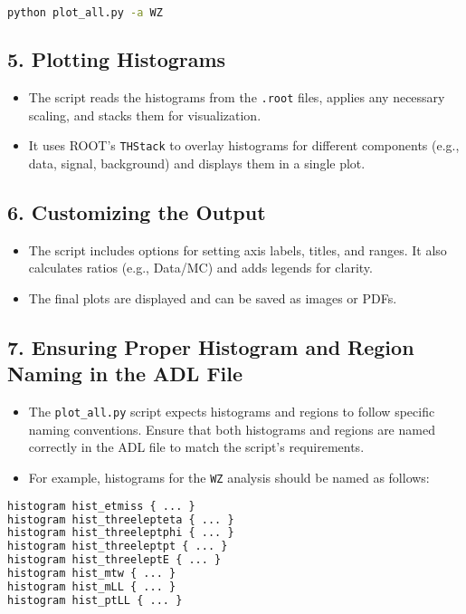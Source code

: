 \documentclass{article}
\begin{document}
\begin{lstlisting}[language=bash]
python plot_all.py -a WZ
\end{lstlisting}

\subsection*{5. Plotting Histograms}
\begin{itemize}
    \item The script reads the histograms from the \texttt{.root} files, applies any necessary scaling, and stacks them for visualization.
    \item It uses ROOT's \texttt{THStack} to overlay histograms for different components (e.g., data, signal, background) and displays them in a single plot.
\end{itemize}

\subsection*{6. Customizing the Output}
\begin{itemize}
    \item The script includes options for setting axis labels, titles, and ranges. It also calculates ratios (e.g., Data/MC) and adds legends for clarity.
    \item The final plots are displayed and can be saved as images or PDFs.
\end{itemize}

\subsection*{7. Ensuring Proper Histogram and Region Naming in the ADL File}
\begin{itemize}
    \item The \texttt{plot\_all.py} script expects histograms and regions to follow specific naming conventions. Ensure that both histograms and regions are named correctly in the ADL file to match the script's requirements.
    \item For example, histograms for the \texttt{WZ} analysis should be named as follows:
\end{itemize}

\begin{lstlisting}[language=tex]
histogram hist_etmiss { ... }
histogram hist_threelepteta { ... }
histogram hist_threeleptphi { ... }
histogram hist_threeleptpt { ... }
histogram hist_threeleptE { ... }
histogram hist_mtw { ... }
histogram hist_mLL { ... }
histogram hist_ptLL { ... }
\end{lstlisting}
\end{document}
